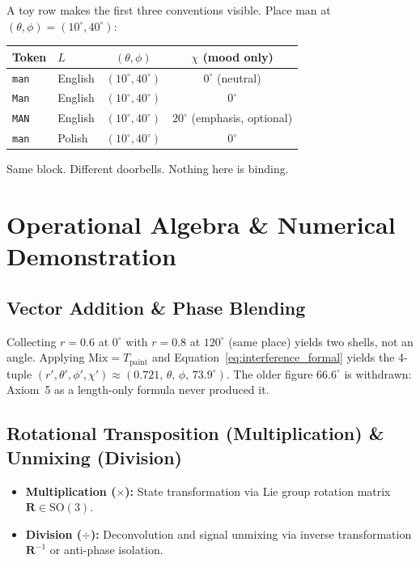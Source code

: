 \documentclass[12pt, a4paper]{article}
\begin{document}
A toy row makes the first three conventions visible. Place
$\mathrm{man}$ at $(\theta,\phi)=(10^\circ,40^\circ)$:

\begin{center}
\begin{tabular}{llcc}
Token & $L$ & $(\theta,\phi)$ & $\chi$ (mood only) \\
\hline
\texttt{man} & English & $(10^\circ,40^\circ)$ & $0^\circ$ (neutral) \\
\texttt{Man} & English & $(10^\circ,40^\circ)$ & $0^\circ$ \\
\texttt{MAN} & English & $(10^\circ,40^\circ)$ & $20^\circ$ (emphasis, optional) \\
\texttt{man} & Polish  & $(10^\circ,40^\circ)$ & $0^\circ$ \\
\end{tabular}
\end{center}

Same block. Different doorbells. Nothing here is binding.

\section{Operational Algebra \& Numerical Demonstration}

\subsection{Vector Addition \& Phase Blending}
Collecting $r=0.6$ at $0^\circ$ with $r=0.8$ at $120^\circ$ (same
place) yields two shells, not an angle. Applying
$\mathrm{Mix}=T_{\mathrm{paint}}$ and
Equation~\eqref{eq:interference_formal} yields the 4-tuple
$(r',\theta',\phi',\chi')\approx(0.721,\,\theta,\,\phi,\,73.9^\circ)$.
The older figure $66.6^\circ$ is withdrawn: Axiom~5 as a length-only
formula never produced it.

\subsection{Rotational Transposition (Multiplication) \& Unmixing (Division)}
\begin{itemize}
    \item \textbf{Multiplication ($\times$):} State transformation via Lie group rotation matrix $\mathbf{R} \in \mathrm{SO}(3)$.
    \item \textbf{Division ($\div$):} Deconvolution and signal unmixing via inverse transformation $\mathbf{R}^{-1}$ or anti-phase isolation.
\end{itemize}
\end{document}
